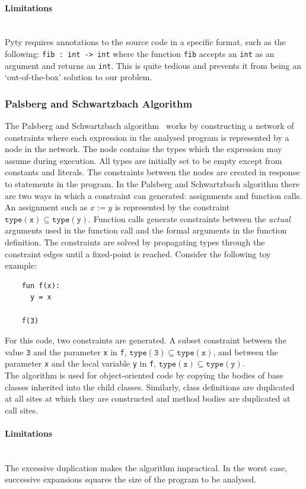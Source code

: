 \documentclass[12pt, titlepage]{article}
\begin{document}
\paragraph{Limitations}\mbox{}\\
Pyty requires annotations to the source code in a specific format, such as the following: \texttt{fib : int -> int} where the function \texttt{fib} accepts an \texttt{int} as an argument and returns an \texttt{int}. This is quite tedious and prevents it from being an `out-of-the-box' solution to our problem.

\subsubsection{Palsberg and Schwartzbach Algorithm}
The Palsberg and Schwartzbach algorithm~\cite{Palsbergstatictyping} works by constructing a network of constraints where each expression in the analysed program is represented by a node in the network. The node contains the types which the expression may assume during execution. All types are initially set to be empty except from constants and literals. The constraints between the nodes are created in response to statements in the program. In the Palsberg and Schwartzbach algorithm there are two ways in which a constraint can generated: assignments and function calls. An assignment such as $x := y$ is represented by the constraint $\mathtt{type(x) \subseteq type(y)}$. Function calls generate constraints between the \textit{actual} arguments used in the function call and the formal arguments in the function definition. The constraints are solved by propagating types through the constraint edges until a fixed-point is reached. Consider the following toy example: 
\begin{lstlisting}
    fun f(x):
      y = x
      
    f(3)
\end{lstlisting}
For this code, two constraints are generated. A subset constraint between the value \texttt{3} and the parameter \texttt{x} in \texttt{f}, $\mathtt{type(3) \subseteq type(x)}$, and between the parameter \texttt{x} and the local variable \texttt{y} in \texttt{f}, $\mathtt{type(x) \subseteq type(y)}$.  \\
\indent The algorithm is used for object-oriented code by copying the bodies of base classes inherited into the child classes. Similarly, class definitions are duplicated at all sites at which they are constructed and method bodies are duplicated at call sites.
\paragraph*{Limitations}\mbox{}\\
The excessive duplication makes the algorithm impractical. In the worst case, successive expansions squares the size of the program to be analysed.
\end{document}
